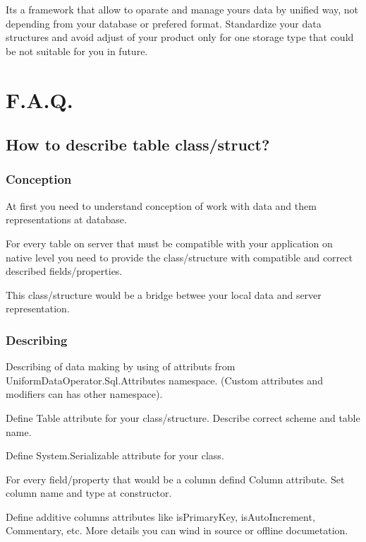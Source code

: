 It\textquotesingle{}s a framework that allow to oparate and manage yours data by unified way, not depending from your database or prefered format. Standardize your data structures and avoid adjust of your product only for one storage type that could be not suitable for you in future.

\section*{F.\+A.\+Q.}

\subsection*{How to describe table class/struct?}

\subsubsection*{Conception}

At first you need to understand conception of work with data and them representations at database.

For every table on server that must be compatible with your application on native level you need to provide the class/structure with compatible and correct described fields/properties.

This class/structure would be a bridge betwee your local data and server representation.

\subsubsection*{Describing}

Describing of data making by using of attributs from {\ttfamily Uniform\+Data\+Operator.\+Sql.\+Attributes} namespace. (Custom attributes and modifiers can has other namespace).


\begin{DoxyEnumerate}
\item Define {\ttfamily Table} attribute for your class/structure. Describe correct scheme and table name.
\item Define {\ttfamily System.\+Serializable} attribute for your class.
\item For every field/property that would be a column defind {\ttfamily Column} attribute. Set column name and type at constructor.
\item Define additive columns\textquotesingle{} attributes like {\ttfamily is\+Primary\+Key}, {\ttfamily is\+Auto\+Increment}, {\ttfamily Commentary}, etc. More details you can wind in source or offline documetation.
\end{DoxyEnumerate}

